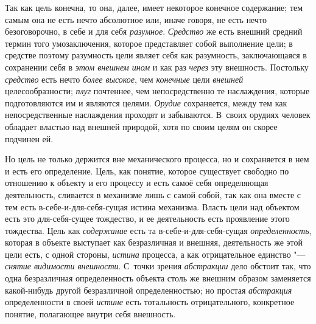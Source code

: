 Так как цель конечна, то она, далее, имеет некоторое конечное
содержание; тем самым она не есть нечто абсолютное или, иначе говоря, не
есть нечто безоговорочно, в себе и для себя
{\em разумное}.
{\em Средство} же есть
внешний средний термин того умозаключения, которое представляет собой
выполнение цели; в средстве поэтому разумность цели являет себя как
разумность, заключающаяся в сохранении себя в
{\em этом внешнем ином}
и как раз {\em через}
эту внешность. Постольку
{\em средство} есть нечто
{\em более высокое}, чем
{\em конечные} цели
{\em внешней}
целесообразности;
{\em плуг} почтеннее, чем
непосредственно те наслаждения, которые подготовляются им и являются
целями. {\em Орудие}
сохраняется, между тем как непосредственные наслаждения
проходят и забываются. В~своих орудиях человек обладает властью над внешней
природой, хотя по своим целям он скорее подчинен ей.

Но цель не только держится вне механического процесса, но и
сохраняется в нем и есть его определение. Цель, как понятие, которое
существует свободно по отношению к объекту и его процессу и есть самоё себя
определяющая деятельность, сливается в механизме лишь с самой собой, так
как она вместе с тем есть в-себе-и-для-себя-сущая истина механизма. Власть
цели над объектом есть это для-себя-сущее тождество, и ее деятельность есть
проявление этого тождества. Цель как
{\em содержание} есть та
в-себе-и-для-себя-сущая
{\em определенность},
которая в объекте выступает как безразличная и внешняя,
деятельность же этой цели есть, с одной стороны,
{\em истина} процесса, а
как отрицательное единство "--- {\em снятие
видимости внешности}. С~точки зрения
{\em абстракции} дело
обстоит так, что одна безразличная определенность объекта столь же внешним
образом заменяется какой-нибудь другой безразличной определенностью; но
простая {\em абстракция}
определенности в своей
{\em истине} есть
тотальность отрицательного, конкретное понятие, полагающее внутри себя
внешность.

